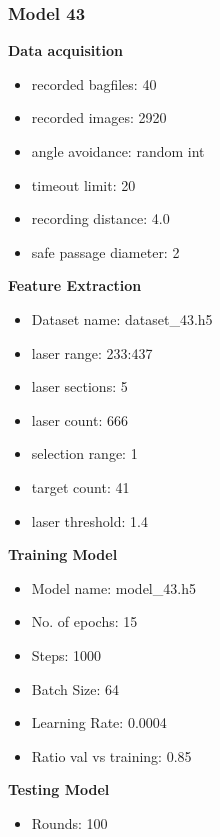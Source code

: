 \subsubsection{Model 43\label{model_43} }
\begin{multicols}{2}\textbf{Data acquisition}
\begin{itemize}
\setlength\itemsep{0.1em}
\item recorded bagfiles: 40
\item recorded images: 2920
\item angle avoidance: random int
\item timeout limit: 20
\item recording distance: 4.0
\item safe passage diameter: 2
\end{itemize}
\textbf{Feature Extraction}
\begin{itemize}
\setlength\itemsep{0.1em}
\item Dataset name: dataset\_43.h5
\item  laser range: 233:437
\item  laser sections: 5
\item  laser count: 666
\item  selection range: 1
\item  target count: 41
\item  laser threshold: 1.4
\end{itemize}
\columnbreak\textbf{Training Model}
\begin{itemize}
\setlength\itemsep{0.1em}
\item  Model name: model\_43.h5
\item  No. of epochs: 15
\item  Steps: 1000
\item  Batch Size: 64
\item  Learning Rate: 0.0004
\item  Ratio val vs training: 0.85
\end{itemize}
\textbf{Testing Model}
\begin{itemize}
\setlength\itemsep{0.1em}
\item Rounds: 100
\newline
\newline
\newline
\newline
\newline
\newline
\newline
\newline

\end{itemize}
\end{multicols}
